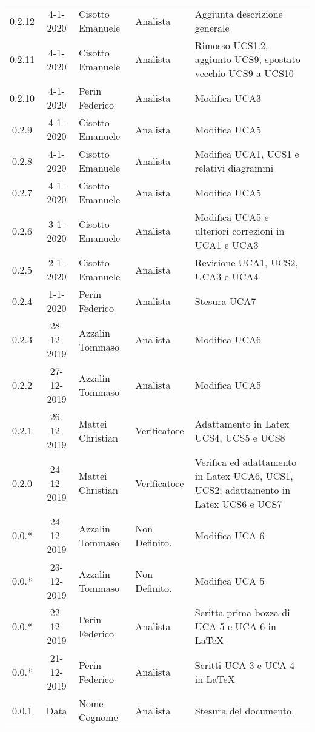 {\begin{longtable}{ c c  C{4cm}  C{3cm} C{4cm}}
0.2.12 & 4-1-2020 & Cisotto Emanuele & Analista & Aggiunta descrizione generale \\

0.2.11 & 4-1-2020 & Cisotto Emanuele & Analista & Rimosso UCS1.2, aggiunto UCS9, spostato vecchio UCS9 a UCS10 \\

0.2.10 & 4-1-2020 & Perin Federico & Analista & Modifica UCA3 \\

0.2.9 & 4-1-2020 & Cisotto Emanuele & Analista & Modifica UCA5 \\

0.2.8 & 4-1-2020 & Cisotto Emanuele & Analista & Modifica UCA1, UCS1 e relativi diagrammi \\

0.2.7 & 4-1-2020 & Cisotto Emanuele & Analista & Modifica UCA5 \\

0.2.6 & 3-1-2020 & Cisotto Emanuele & Analista & Modifica UCA5 e ulteriori correzioni in UCA1 e UCA3 \\

0.2.5 & 2-1-2020 & Cisotto Emanuele & Analista & Revisione UCA1, UCS2, UCA3 e UCA4 \\

0.2.4 & 1-1-2020 & Perin Federico & Analista & Stesura UCA7 \\

0.2.3 & 28-12-2019 & Azzalin Tommaso & Analista & Modifica UCA6 \\

0.2.2 & 27-12-2019 & Azzalin Tommaso & Analista & Modifica UCA5 \\

0.2.1 & 26-12-2019 & Mattei Christian & Verificatore & Adattamento in Latex UCS4, UCS5 e UCS8 \\

0.2.0 & 24-12-2019 & Mattei Christian & Verificatore & Verifica ed adattamento in Latex UCA6, UCS1, UCS2; adattamento in Latex UCS6 e UCS7 \\

0.0.* & 24-12-2019 & Azzalin Tommaso & Non Definito. & Modifica UCA 6\\

0.0.* & 23-12-2019 & Azzalin Tommaso & Non Definito. & Modifica UCA 5\\

0.0.* & 22-12-2019 & Perin Federico & Analista & Scritta prima bozza di UCA 5 e UCA 6 in LaTeX\\

0.0.* & 21-12-2019 & Perin Federico & Analista & Scritti UCA 3 e UCA 4 in LaTeX\\

0.0.1 & Data & Nome Cognome & Analista & Stesura del documento.  \\		
		
\end{longtable}
}